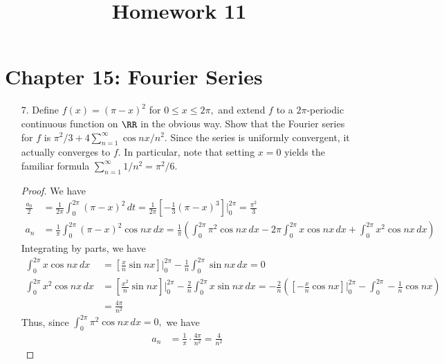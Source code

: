 \documentclass{article}
\begin{document}
\title{Homework 11}
\maketitle
\thispagestyle{fancy}

\section*{Chapter 15: Fourier Series}

\begin{itemize}
	\item[7.] Define $f(x)=(\pi-x)^2$ for $0\le x\le 2\pi,$ and extend $f$ to a $2\pi$-periodic continuous function on $\RR$ in the obvious way. Show that the Fourier series for $f$ is $\pi^2/3+4\sum_{n=1}^{\infty} \cos nx/n^2.$ Since the series is uniformly convergent, it actually converges to $f.$ In particular, note that setting $x=0$ yields the familiar formula $\sum_{n=1}^{\infty} 1/n^2=\pi^2/6.$
		\begin{proof}
			We have
			\begin{align*}
				\frac{a_0}{2}&= \frac{1}{2\pi} \int_{0}^{2\pi} (\pi-x)^2\, dt = \frac{1}{2\pi} \left[ -\frac{1}{3}(\pi-x)^3 \right]\bigg\vert_{0}^{2\pi} = \frac{\pi^2}{3} \\
				a_n &= \frac{1}{\pi} \int_{0}^{2\pi} (\pi-x)^2 \cos nx\, dx = \frac{1}{\pi} \left( \int_0^{2\pi} \pi^2\cos nx\, dx - 2\pi \int_0^{2\pi} x\cos nx\, dx + \int_0^{2\pi} x^2\cos nx\, dx \right)
			\end{align*}
			Integrating by parts, we have
			\begin{align*}
				\int_0^{2\pi} x\cos nx\, dx &= \left[ \frac{x}{n} \sin nx \right]\bigg\vert_0^{2\pi} - \frac{1}{n} \int_0^{2\pi} \sin nx\, dx = 0 \\
				\int_0^{2\pi} x^2\cos nx\, dx &= \left[ \frac{x^2}{n} \sin nx \right]\bigg\vert_0^{2\pi} - \frac{2}{n}\int_0^{2\pi} x\sin nx\, dx = -\frac{2}{n} \left( \left[-\frac{x}{n}\cos nx\right]\bigg\vert_0^{2\pi} - \int_0^{2\pi} -\frac{1}{n} \cos nx \right) \\
				&= \frac{4\pi}{n^2}
			\end{align*}
			Thus, since $\int_0^{2\pi} \pi^2\cos nx\, dx=0,$ we have
			\begin{align*}
				a_n &= \frac{1}{\pi} \cdot \frac{4\pi}{n^2} = \frac{4}{n^2}
			\end{align*}


\end{proof}
\end{itemize}
\end{document}
